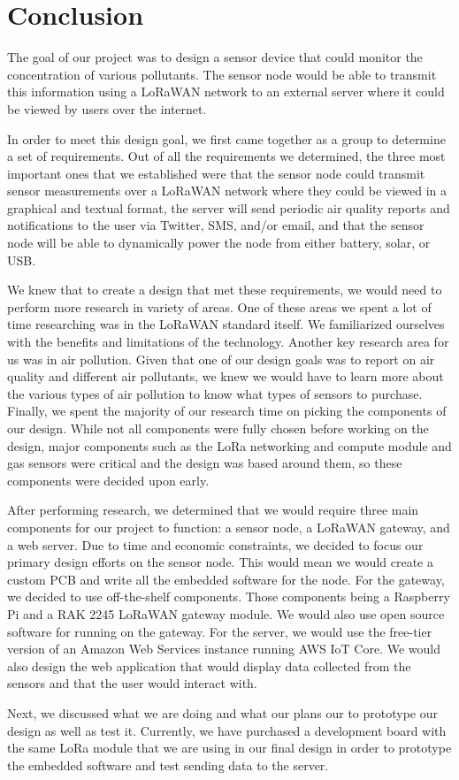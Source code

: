 \section{Conclusion}
The goal of our project was to design a sensor device that could monitor the concentration of various pollutants. The sensor node would be able to transmit this information using a LoRaWAN network to an external server where it could be viewed by users over the internet.

In order to meet this design goal, we first came together as a group to determine a set of requirements. Out of all the requirements we determined, the three most important ones that we established were that the sensor node could transmit sensor measurements over a LoRaWAN network where they could be viewed in a graphical and textual format, the server will send periodic air quality reports and notifications to the user via Twitter, SMS, and/or email, and that the sensor node will be able to dynamically power the node from either battery, solar, or USB. 

We knew that to create a design that met these requirements, we would need to perform more research in variety of areas. One of these areas we spent a lot of time researching was in the LoRaWAN standard itself. We familiarized ourselves with the benefits and limitations of the technology. Another key research area for us was in air pollution. Given that one of our design goals was to report on air quality and different air pollutants, we knew we would have to learn more about the various types of air pollution to know what types of sensors to purchase. Finally, we spent the majority of our research time on picking the components of our design. While not all components were fully chosen before working on the design, major components such as the LoRa networking and compute module and gas sensors were critical and the design was based around them, so these components were decided upon early.

After performing research, we determined that we would require three main components for our project to function: a sensor node, a LoRaWAN gateway, and a web server. Due to time and economic constraints, we decided to focus our primary design efforts on the sensor node. This would mean we would create a custom PCB and write all the embedded software for the node. For the gateway, we decided to use off-the-shelf components. Those components being a Raspberry Pi and a RAK 2245 LoRaWAN gateway module. We would also use open source software for running on the gateway. For the server, we would use the free-tier version of an Amazon Web Services instance running AWS IoT Core. We would also design the web application that would display data collected from the sensors and that the user would interact with.

Next, we discussed what we are doing and what our plans our to prototype our design as well as test it. Currently, we have purchased a development board with the same LoRa module that we are using in our final design in order to prototype the embedded software and test sending data to the server.

